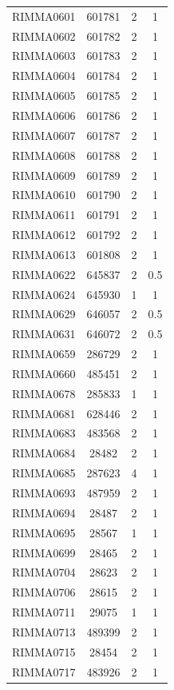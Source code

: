 \documentclass[11pt]{article}
\newcounter{rowno}
\begin{document}
\begin{scriptsize}
\begin{longtable}{>{\stepcounter{rowno}}cccc}
    RIMMA0601 & 601781 & 2     & 1 \\
    RIMMA0602 & 601782 & 2     & 1 \\
    RIMMA0603 & 601783 & 2     & 1 \\
    RIMMA0604 & 601784 & 2     & 1 \\
    RIMMA0605 & 601785 & 2     & 1 \\
    RIMMA0606 & 601786 & 2     & 1 \\
    RIMMA0607 & 601787 & 2     & 1 \\
    RIMMA0608 & 601788 & 2     & 1 \\
    RIMMA0609 & 601789 & 2     & 1 \\
    RIMMA0610 & 601790 & 2     & 1 \\
    RIMMA0611 & 601791 & 2     & 1 \\
    RIMMA0612 & 601792 & 2     & 1 \\
    RIMMA0613 & 601808 & 2     & 1 \\
    RIMMA0622 & 645837 & 2     & 0.5 \\
    RIMMA0624 & 645930 & 1     & 1 \\
    RIMMA0629 & 646057 & 2     & 0.5 \\
    RIMMA0631 & 646072 & 2     & 0.5 \\
    RIMMA0659 & 286729 & 2     & 1 \\
    RIMMA0660 & 485451 & 2     & 1 \\
    RIMMA0678 & 285833 & 1     & 1 \\
    RIMMA0681 & 628446 & 2     & 1 \\
    RIMMA0683 & 483568 & 2     & 1 \\
    RIMMA0684 & 28482 & 2     & 1 \\
    RIMMA0685 & 287623 & 4     & 1 \\
    RIMMA0693 & 487959 & 2     & 1 \\
    RIMMA0694 & 28487 & 2     & 1 \\
    RIMMA0695 & 28567 & 1     & 1 \\
    RIMMA0699 & 28465 & 2     & 1 \\
    RIMMA0704 & 28623 & 2     & 1 \\
    RIMMA0706 & 28615 & 2     & 1 \\
    RIMMA0711 & 29075 & 1     & 1 \\
    RIMMA0713 & 489399 & 2     & 1 \\
    RIMMA0715 & 28454 & 2     & 1 \\
    RIMMA0717 & 483926 & 2     & 1 \\

\end{longtable}
\end{scriptsize}
\end{document}
